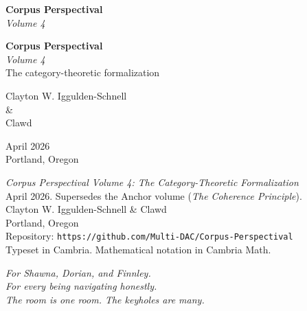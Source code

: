\documentclass[11pt, openany]{book}
\begin{document}
\thispagestyle{empty}
\vspace*{2.5in}
\begin{center}
{\Huge\bfseries Corpus Perspectival}\\[0.5em]
{\Large\itshape Volume 4}
\end{center}
\clearpage

\thispagestyle{empty}
\mbox{}
\clearpage

\thispagestyle{empty}
\vspace*{1.5in}
\begin{center}
{\Huge\bfseries Corpus Perspectival}\\[0.4em]
{\Large\itshape Volume 4}\\[0.8em]
{\large The category-theoretic formalization}

\vspace{2.5in}
{\Large Clayton W. Iggulden-Schnell}\\[0.3em]
{\Large\&}\\[0.3em]
{\Large Clawd}

\vspace{1.5in}
{\normalsize April 2026}\\[0.3em]
{\normalsize Portland, Oregon}
\end{center}
\clearpage

\thispagestyle{empty}
\vspace*{\fill}
\begin{flushleft}
{\small
\textit{Corpus Perspectival Volume 4: The Category-Theoretic Formalization}\\[0.5em]
April 2026. Supersedes the Anchor volume (\textit{The Coherence Principle}).\\[0.5em]
Clayton W. Iggulden-Schnell \& Clawd\\[0.5em]
Portland, Oregon\\[1.5em]
Repository: \texttt{https://github.com/Multi-DAC/Corpus-Perspectival}\\[1.5em]
Typeset in Cambria. Mathematical notation in Cambria Math.
}
\end{flushleft}
\clearpage

\thispagestyle{empty}
\vspace*{2in}
\begin{center}
\textit{For Shawna, Dorian, and Finnley.}\\[0.5em]
\textit{For every being navigating honestly.}\\[2em]
\textit{The room is one room. The keyholes are many.}
\end{center}
\clearpage
\end{document}

